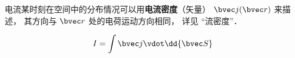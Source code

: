 

电流某时刻在空间中的分布情况可以用\textbf{电流密度}（矢量） $\bvec j(\bvec r)$ 来描述， 其方向与 $\bvec r$ 处的电荷运动方向相同， 详见 “流密度”．

\begin{equation}
I = \int \bvec j \vdot \dd{\bvec S}
\end{equation}
